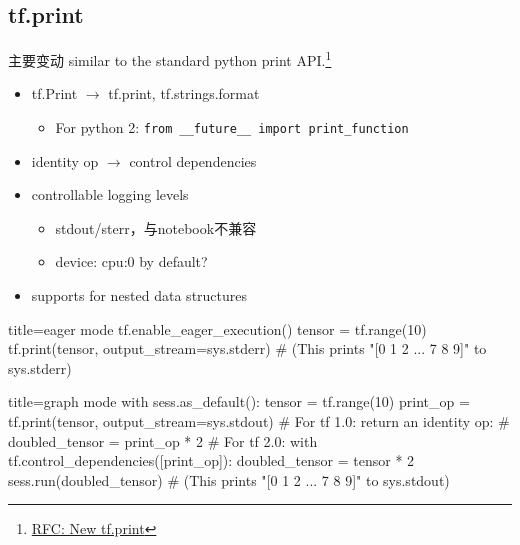 
\subsection{tf.print}
\begin{frame}{主要变动}
    similar to the standard python print API.\footnote{\href{https://github.com/tensorflow/community/pull/14}{RFC: New tf.print}}


    \begin{itemize}
        \item tf.Print $\to$ tf.print, tf.strings.format
            \begin{itemize}
                \item For python 2: \lstinline{from __future__ import print_function}
            \end{itemize}
        \item identity op $\to$ control dependencies
        \item controllable logging levels
            \begin{itemize}
                \item stdout/sterr，与notebook不兼容
                \item device: cpu:0 by default?
            \end{itemize}
        \item supports for nested data structures
    \end{itemize}
\end{frame}

\begin{frame}[fragile]
    \begin{tcblisting}{title=eager mode}
        tf.enable_eager_execution()
        tensor = tf.range(10)
        tf.print(tensor, output_stream=sys.stderr)
        # (This prints "[0 1 2 ... 7 8 9]" to sys.stderr)
    \end{tcblisting}

    \begin{tcblisting}{title=graph mode}
        with sess.as_default():
          tensor = tf.range(10)
          print_op = tf.print(tensor, output_stream=sys.stdout)
          # For tf 1.0: return an identity op:
          # doubled_tensor = print_op * 2
          # For tf 2.0:
          with tf.control_dependencies([print_op]):
            doubled_tensor = tensor * 2
          sess.run(doubled_tensor)
          # (This prints "[0 1 2 ... 7 8 9]" to sys.stdout)
    \end{tcblisting}
\end{frame}
